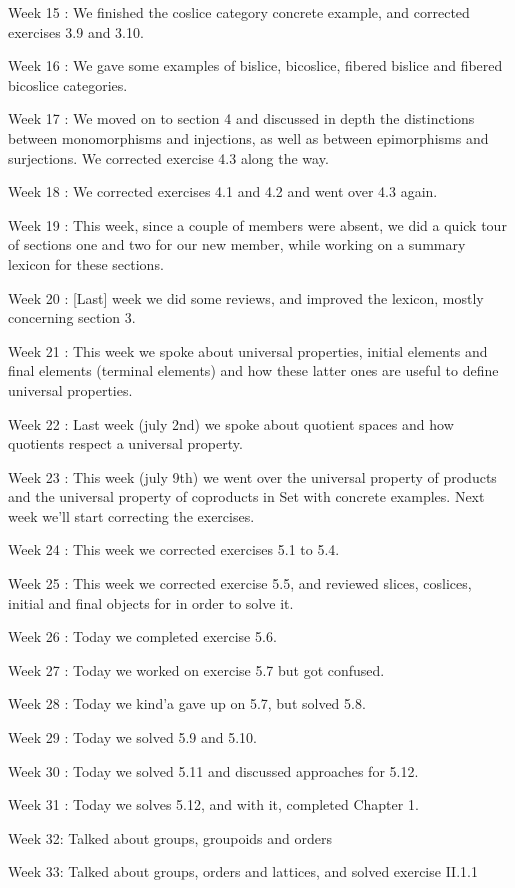 Week 15 : We finished the coslice category concrete example, and corrected exercises 3.9 and 3.10.

Week 16 : We gave some examples of bislice, bicoslice, fibered bislice and fibered bicoslice categories.

Week 17 : We moved on to section 4 and discussed in depth the distinctions between monomorphisms and injections, as well as between epimorphisms and surjections. We corrected exercise 4.3 along the way.

Week 18 : We corrected exercises 4.1 and 4.2 and went over 4.3 again.

Week 19 : This week, since a couple of members were absent, we did a quick tour of sections one and two for our new member, while working on a summary lexicon for these sections.

Week 20 : [Last] week we did some reviews, and improved the lexicon, mostly concerning section 3.

Week 21 : This week we spoke about universal properties, initial elements and final elements (terminal elements) and how these latter ones are useful to define universal properties.

Week 22 : Last week (july 2nd) we spoke about quotient spaces and how quotients respect a universal property.

Week 23 : This week (july 9th) we went over the universal property of products and the universal property of coproducts in Set with concrete examples. Next week we'll start correcting the exercises.

Week 24 : This week we corrected exercises 5.1 to 5.4.

Week 25 : This week we corrected exercise 5.5, and reviewed slices, coslices, initial and final objects for in order to solve it.

Week 26 : Today we completed exercise 5.6.

Week 27 : Today we worked on exercise 5.7 but got confused.

Week 28 : Today we kind'a gave up on 5.7, but solved 5.8.

Week 29 : Today we solved 5.9 and 5.10.

Week 30 : Today we solved 5.11 and discussed approaches for 5.12.

Week 31 : Today we solves 5.12, and with it, completed Chapter 1.

Week 32: Talked about groups, groupoids and orders

Week 33: Talked about groups, orders and lattices, and solved exercise II.1.1

